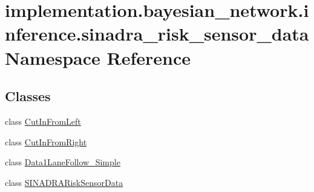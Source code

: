 \hypertarget{namespaceimplementation_1_1bayesian__network_1_1inference_1_1sinadra__risk__sensor__data}{}\section{implementation.\+bayesian\+\_\+network.\+inference.\+sinadra\+\_\+risk\+\_\+sensor\+\_\+data Namespace Reference}
\label{namespaceimplementation_1_1bayesian__network_1_1inference_1_1sinadra__risk__sensor__data}
\subsection*{Classes}
\begin{DoxyCompactItemize}
\item 
class \hyperlink{classimplementation_1_1bayesian__network_1_1inference_1_1sinadra__risk__sensor__data_1_1_cut_in_from_left}{Cut\+In\+From\+Left}
\item 
class \hyperlink{classimplementation_1_1bayesian__network_1_1inference_1_1sinadra__risk__sensor__data_1_1_cut_in_from_right}{Cut\+In\+From\+Right}
\item 
class \hyperlink{classimplementation_1_1bayesian__network_1_1inference_1_1sinadra__risk__sensor__data_1_1_data1_lane_follow___simple}{Data1\+Lane\+Follow\+\_\+\+Simple}
\item 
class \hyperlink{classimplementation_1_1bayesian__network_1_1inference_1_1sinadra__risk__sensor__data_1_1_s_i_n_a_d_r_a_risk_sensor_data}{S\+I\+N\+A\+D\+R\+A\+Risk\+Sensor\+Data}
\end{DoxyCompactItemize}
